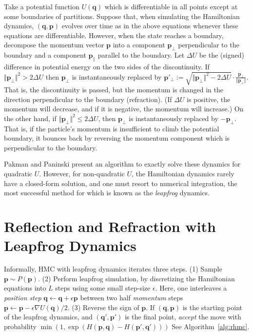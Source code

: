 \documentclass{article} %
\newcommand{\bvec}[1]{\textbf{#1}}
\begin{document}
Take a potential function $U(\bvec{q})$ which is differentiable in all points except at some boundaries of partitions.  Suppose that, when simulating the Hamiltonian dynamics, $(\bvec{q}, \bvec{p})$ evolves over time as in the above equations whenever these equations are differentiable.  However, when the state reaches a boundary, decompose the momentum vector $\bvec{p}$ into a component $\bvec{p}_\perp$ perpendicular to the boundary and a component $\bvec{p}_\parallel$ parallel to the boundary.  
Let $\Delta U$ be the (signed) difference in potential energy on the two sides of the discontinuity.   If $\Vert \bvec{p}_\perp \Vert^2 > 2\Delta U$ then $\bvec{p}_\perp$ is instantaneously replaced by $\bvec{p}'_\perp := \sqrt{ \Vert \bvec{p}_\perp \Vert^2 - 2 \Delta U} \cdot \frac{\bvec{p}_\perp}{\Vert \bvec{p}_\perp \Vert}$. 
That is, the discontinuity is passed, but the momentum is changed in the direction perpendicular to the boundary (refraction).  (If $\Delta U$ is positive, the momentum will decrease, and if it is negative, the momentum will increase.)  On the other hand, if $\Vert \bvec{p}_\perp \Vert^2 \leq 2\Delta U$, then $\bvec{p}_\perp$ is instantaneously replaced by $-\bvec{p}_\perp$.  That is, if the particle's momentum is insufficient to climb the potential boundary, it bounces back by reversing the momentum component which is perpendicular to the boundary.

Pakman and Paninski \cite{pakman2014exact, pakman2013auxiliary} present an algorithm to exactly solve these dynamics for quadratic $U$.  However, for non-quadratic $U$, the Hamiltonian dynamics rarely have a closed-form solution, and one must resort to numerical integration, the most successful method for which is known as the \emph{leapfrog} dynamics.




\section{Reflection and Refraction with Leapfrog Dynamics}

Informally, HMC with leapfrog dynamics iterates three steps. (1) Sample $\bvec{p} \sim P(\bvec{p})$. (2) Perform leapfrog simulation, by discretizing the Hamiltonian equations into $L$ steps using some small step-size $\epsilon$.  Here, one interleaves a \emph{position step} 
$\bvec{q} \leftarrow \bvec{q} + \epsilon \bvec{p}$ 
between two half \emph{momentum} steps $\bvec{p} \leftarrow \bvec{p} - \epsilon \nabla U(\bvec{q})/2.$ (3) Reverse the sign of $\bvec{p}$. If $(\bvec{q},\bvec{p})$ is the starting point of the leapfrog dynamics, and $(\bvec{q}', \bvec{p}')$ is the final point, \emph{accept} the move with probability $\min(1,\exp(H(\bvec{p},\bvec{q})-H(\bvec{p}', \bvec{q}')))$  See Algorithm~\ref{alg:rhmc}.
\end{document}
